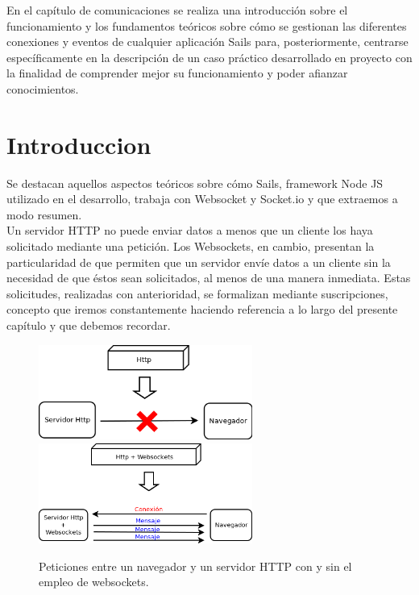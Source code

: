 \documentclass[a4paper,12pt]{article}
\begin{document}
En el capítulo de comunicaciones se realiza una introducción sobre el funcionamiento y los fundamentos teóricos sobre cómo se gestionan las diferentes conexiones y eventos de cualquier aplicación
Sails para, posteriormente, centrarse específicamente en la descripción de un caso práctico desarrollado en proyecto con la finalidad de comprender mejor su funcionamiento y poder afianzar
conocimientos.

\section{Introduccion}

Se destacan aquellos aspectos teóricos sobre cómo Sails, framework Node JS utilizado en el desarrollo, trabaja con Websocket y Socket.io y que extraemos a modo resumen.\\

Un servidor HTTP no puede enviar datos a menos que un cliente los haya solicitado mediante una petición. Los Websockets, en cambio, presentan la particularidad de que
permiten que un servidor envíe datos a un cliente sin la necesidad de que éstos sean solicitados, al menos de una manera inmediata. Estas solicitudes, realizadas con anterioridad, se formalizan mediante suscripciones, concepto que 
iremos constantemente haciendo referencia a lo largo del presente capítulo y que debemos recordar.\\

\begin{figure}%
    \centering
    \includegraphics[width=7cm]{imagenes/http-weboscket.png}
    \qquad
    \includegraphics[width=7cm]{imagenes/http+weboscket.png}
    \caption{Peticiones entre un navegador y un servidor HTTP con y sin el empleo de websockets.}%
    \label{fig:http-request}%
\end{figure}
\end{document}
